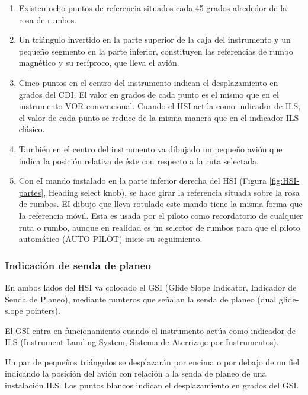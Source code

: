\begin{enumerate}

\item Existen ocho puntos de referencia situados cada 45 grados alrededor de la rosa de rumbos.

\item Un triángulo invertido en la parte superior de la caja del instrumento y un pequeño segmento en la parte inferior, constituyen las referencias de rumbo magnético y su recíproco, que lleva el avión.

\item Cinco puntos en el centro del instrumento indican el desplazamiento en grados del CDI. El valor en grados de cada punto es el mismo que en el instrumento VOR convencional. Cuando el HSI actúa como indicador de ILS, el valor de cada punto se reduce de la misma manera que en el indicador ILS clásico. 

\item También en el centro del instrumento va dibujado un pequeño avión que indica la posición relativa de éste con respecto a la ruta selectada.

\item Con eI mando instalado en la parte inferior derecha del HSI (Figura \ref{fig:HSI-partes}, Heading select knob), se hace girar la referencia situada sobre la rosa de rumbos. EI dibujo que lleva rotulado este mando tiene la misma forma que Ia referencia móvil. Esta es usada por el piloto como recordatorio de cualquier ruta o rumbo, aunque en realidad es un selector de rumbos para que el piloto automático (AUTO PILOT) inicie su seguimiento.

\end{enumerate}

\subsubsection{Indicaci\'on de senda de planeo}

En ambos lados del HSI va colocado el GSI (Glide Slope Indicator, Indicador de Senda de Planeo), mediante punteros que señalan la senda de planeo (dual glide-slope pointers).

El GSI entra en funcionamiento cuando el instrumento actúa como indicador de ILS (Instrument Landing System, Sistema de Aterrizaje por Instrumentos).

Un par de pequeños triángulos se desplazarán por encima o por debajo de un fiel indicando la posición del avión con relación a la senda de planeo de una instalación ILS. Los puntos blancos indican el desplazamiento en grados del GSI. 

